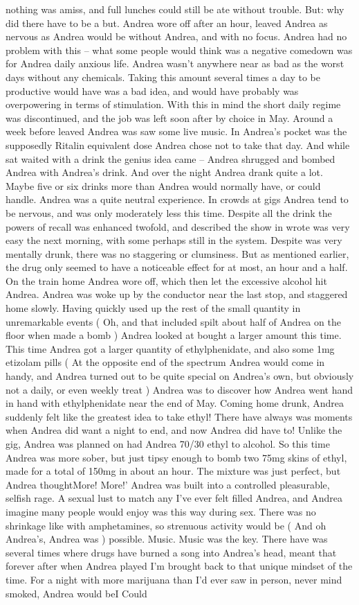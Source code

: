\documentclass[12pt]{book}
\begin{document}
nothing was amiss, and full lunches could still be ate without trouble. But: why did there have to be a but. Andrea wore off after an hour, leaved Andrea as nervous as Andrea would be without Andrea, and with no focus. Andrea had no problem with this -- what some people would think was a negative comedown was for Andrea daily anxious life. Andrea wasn't anywhere near as bad as the worst days without any chemicals. Taking this amount several times a day to be productive would have was a bad idea, and would have probably was overpowering in terms of stimulation. With this in mind the short daily regime was discontinued, and the job was left soon after by choice in May. Around a week before leaved Andrea was saw some live music. In Andrea's pocket was the supposedly Ritalin equivalent dose Andrea chose not to take that day. And while sat waited with a drink the genius idea came -- Andrea shrugged and bombed Andrea with Andrea's drink. And over the night Andrea drank quite a lot. Maybe five or six drinks more than Andrea would normally have, or could handle. Andrea was a quite neutral experience. In crowds at gigs Andrea tend to be nervous, and was only moderately less this time. Despite all the drink the powers of recall was enhanced twofold, and described the show in wrote was very easy the next morning, with some perhaps still in the system. Despite was very mentally drunk, there was no staggering or clumsiness. But as mentioned earlier, the drug only seemed to have a noticeable effect for at most, an hour and a half. On the train home Andrea wore off, which then let the excessive alcohol hit Andrea. Andrea was woke up by the conductor near the last stop, and staggered home slowly. Having quickly used up the rest of the small quantity in unremarkable events ( Oh, and that included spilt about half of Andrea on the floor when made a bomb ) Andrea looked at bought a larger amount this time. This time Andrea got a larger quantity of ethylphenidate, and also some 1mg etizolam pills ( At the opposite end of the spectrum Andrea would come in handy, and Andrea turned out to be quite special on Andrea's own, but obviously not a daily, or even weekly treat ) Andrea was to discover how Andrea went hand in hand with ethylphenidate near the end of May. Coming home drunk, Andrea suddenly felt like the greatest idea to take ethyl! There have always was moments when Andrea did want a night to end, and now Andrea did have to! Unlike the gig, Andrea was planned on had Andrea 70/30 ethyl to alcohol. So this time Andrea was more sober, but just tipsy enough to bomb two 75mg skins of ethyl, made for a total of 150mg in about an hour. The mixture was just perfect, but Andrea thoughtMore! More!' Andrea was built into a controlled pleasurable, selfish rage. A sexual lust to match any I've ever felt filled Andrea, and Andrea imagine many people would enjoy was this way during sex. There was no shrinkage like with amphetamines, so strenuous activity would be ( And oh Andrea's, Andrea was ) possible. Music. Music was the key. There have was several times where drugs have burned a song into Andrea's head, meant that forever after when Andrea played I'm brought back to that unique mindset of the time. For a night with more marijuana than I'd ever saw in person, never mind smoked, Andrea would beI Could 
\end{document}
